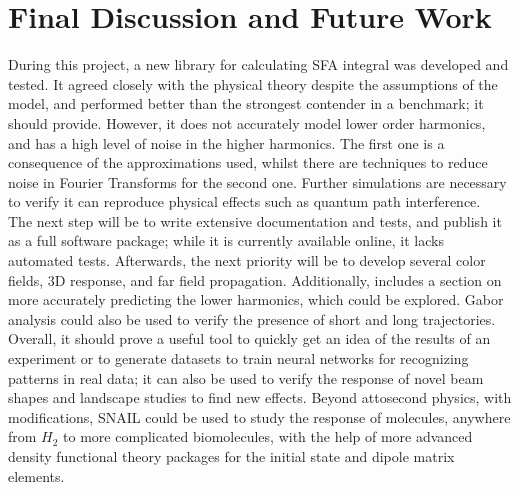 \documentclass[11pt,a4paper]{report}
\begin{document}
\section{Final Discussion and Future Work}
During this project, a new library for calculating SFA integral was developed and tested. It agreed closely with the physical theory despite the assumptions of the model, and performed better than the strongest contender in a benchmark; it should provide. 
However, it does not accurately model lower order harmonics, and has a high level of noise in the higher harmonics. The first one is a consequence of the approximations used, whilst there are techniques to reduce noise in Fourier Transforms for the second one. Further simulations are necessary to verify it can reproduce physical effects such as quantum path interference.
\\

The next step will be to write extensive documentation and tests, and publish it as a full software package; while it is currently available online, it lacks automated tests. Afterwards, the next priority will be to develop several color fields, 3D response, and far field propagation. Additionally, \cite{lewensteinog} includes a section on more accurately predicting the lower harmonics, which could be explored. Gabor analysis could also be used to verify the presence of short and long trajectories.
\\

Overall, it should prove a useful tool to quickly get an idea of the results of an experiment or to generate datasets to train neural networks for recognizing patterns in real data; it can also be used to verify the response of novel beam shapes and landscape studies to find new effects. Beyond attosecond physics, with modifications, SNAIL could be used to study the response of molecules, anywhere from $H_2$ to more complicated biomolecules, with the help of more advanced density functional theory packages for the initial state and dipole matrix elements. 

\printbibliography
\end{document}
